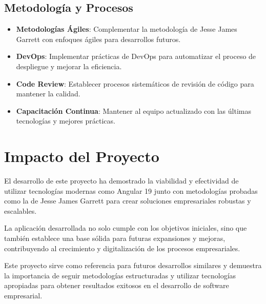 \subsection{Metodología y Procesos}

\begin{itemize}
    \item \textbf{Metodologías Ágiles}: Complementar la metodología de Jesse James Garrett con enfoques ágiles para desarrollos futuros.
    \item \textbf{DevOps}: Implementar prácticas de DevOps para automatizar el proceso de despliegue y mejorar la eficiencia.
    \item \textbf{Code Review}: Establecer procesos sistemáticos de revisión de código para mantener la calidad.
    \item \textbf{Capacitación Continua}: Mantener al equipo actualizado con las últimas tecnologías y mejores prácticas.
\end{itemize}

\section{Impacto del Proyecto}

El desarrollo de este proyecto ha demostrado la viabilidad y efectividad de utilizar tecnologías modernas como Angular 19 junto con metodologías probadas como la de Jesse James Garrett para crear soluciones empresariales robustas y escalables.

La aplicación desarrollada no solo cumple con los objetivos iniciales, sino que también establece una base sólida para futuras expansiones y mejoras, contribuyendo al crecimiento y digitalización de los procesos empresariales.

Este proyecto sirve como referencia para futuros desarrollos similares y demuestra la importancia de seguir metodologías estructuradas y utilizar tecnologías apropiadas para obtener resultados exitosos en el desarrollo de software empresarial.
